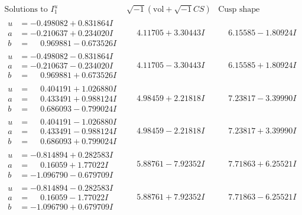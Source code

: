 \documentclass[1p]{elsarticle_modified}
\theoremstyle{definition}
\newcommand{\I}{\sqrt{-1}}
\begin{document}
$$\begin{array}{c|c|c}  
\text{Solutions to }I^u_{1}& \I (\text{vol} + \sqrt{-1}CS) & \text{Cusp shape}\\
 \hline 
\begin{aligned}
u &= -0.498082 + 0.831864 I \\
a &= -0.210637 + 0.234020 I \\
b &= \phantom{-}0.969881 - 0.673526 I\end{aligned}
 & \phantom{-}4.11705 + 3.30443 I & \phantom{-}6.15585 - 1.80924 I \\ \hline\begin{aligned}
u &= -0.498082 - 0.831864 I \\
a &= -0.210637 - 0.234020 I \\
b &= \phantom{-}0.969881 + 0.673526 I\end{aligned}
 & \phantom{-}4.11705 - 3.30443 I & \phantom{-}6.15585 + 1.80924 I \\ \hline\begin{aligned}
u &= \phantom{-}0.404191 + 1.026880 I \\
a &= \phantom{-}0.433491 + 0.988124 I \\
b &= \phantom{-}0.686093 - 0.799024 I\end{aligned}
 & \phantom{-}4.98459 + 2.21818 I & \phantom{-}7.23817 - 3.39990 I \\ \hline\begin{aligned}
u &= \phantom{-}0.404191 - 1.026880 I \\
a &= \phantom{-}0.433491 - 0.988124 I \\
b &= \phantom{-}0.686093 + 0.799024 I\end{aligned}
 & \phantom{-}4.98459 - 2.21818 I & \phantom{-}7.23817 + 3.39990 I \\ \hline\begin{aligned}
u &= -0.814894 + 0.282583 I \\
a &= \phantom{-}0.16059 + 1.77022 I \\
b &= -1.096790 - 0.679709 I\end{aligned}
 & \phantom{-}5.88761 - 7.92352 I & \phantom{-}7.71863 + 6.25521 I \\ \hline\begin{aligned}
u &= -0.814894 - 0.282583 I \\
a &= \phantom{-}0.16059 - 1.77022 I \\
b &= -1.096790 + 0.679709 I\end{aligned}
 & \phantom{-}5.88761 + 7.92352 I & \phantom{-}7.71863 - 6.25521 I \\ \hline\begin{aligned}

\end{aligned}
\end{array}$$
\end{document}
